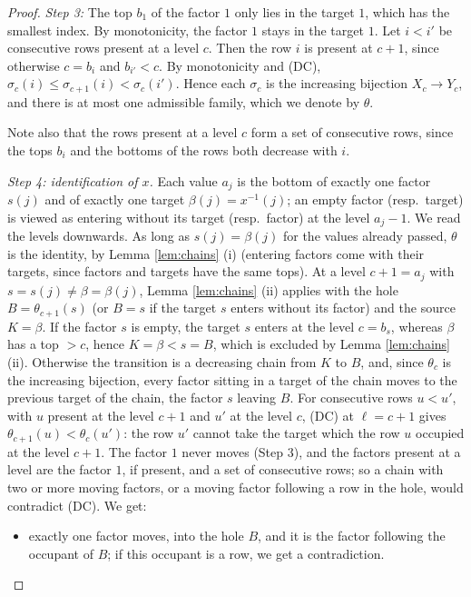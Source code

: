 \documentclass[a4paper,12pt,leqno]{amsart}
\theoremstyle{plain}
\theoremstyle{definition}
\theoremstyle{definition}
\begin{document}
\begin{proof}
\emph{Step 3:} The top $b_1$ of the factor $1$ only lies in the target
$1$, which has the smallest index. By monotonicity, the factor $1$ stays in the target $1$. Let
$i<i'$ be consecutive rows present at a level $c$. Then the row $i$ is present at $c+1$, since
otherwise $c=b_i$ and $b_{i'}<c$. By monotonicity and (DC),
$\sigma_c(i)\leq\sigma_{c+1}(i)<\sigma_c(i')$. Hence each $\sigma_c$ is the increasing bijection
$X_c\rightarrow Y_c$, and there is at most one admissible family, which we denote by $\theta$.

Note also that the rows present at a level $c$ form a set of consecutive rows, since the tops $b_i$
and the bottoms of the rows both decrease with $i$.

\emph{Step 4: identification of $x$.} Each value $a_j$ is the bottom of exactly one factor $s(j)$ and
of exactly one target $\beta(j)=x^{-1}(j)$; an empty factor (resp.\ target) is viewed as entering
without its target (resp.\ factor) at the level $a_j-1$. We read the levels downwards. As long as
$s(j)=\beta(j)$ for the values already passed, $\theta$ is the identity, by Lemma \ref{lem:chains} (i)
(entering factors come with their targets, since factors and targets have the same tops). At a level
$c+1=a_j$ with $s=s(j)\neq\beta=\beta(j)$, Lemma \ref{lem:chains} (ii) applies with the hole
$B=\theta_{c+1}(s)$ (or $B=s$ if the target $s$ enters without its factor) and the source $K=\beta$. If the
factor $s$ is empty, the target $s$ enters at the level $c=b_s$, whereas $\beta$ has a top $>c$, hence
$K=\beta<s=B$, which is excluded by Lemma \ref{lem:chains} (ii). Otherwise the transition is a decreasing chain from $K$ to $B$, and, since
$\theta_c$ is the increasing bijection, every factor sitting in a target of the chain moves to the
previous target of the chain, the factor $s$ leaving $B$. For consecutive rows $u<u'$, with $u$ present
at the level $c+1$ and $u'$ at the level $c$, (DC) at $\ell=c+1$ gives $\theta_{c+1}(u)<\theta_c(u')$: the
row $u'$ cannot take the target which the row $u$ occupied at the level $c+1$. The factor $1$ never moves
(Step 3), and the factors present at a level are the factor $1$, if present, and a set of consecutive
rows; so a chain with two or more moving factors, or a moving factor following a row in the hole, would
contradict (DC). We get:
\begin{itemize}
\item[$(*)$] exactly one factor moves, into the hole $B$, and it is the factor following the
occupant of $B$; if this occupant is a row, we get a contradiction.
\end{itemize}

\end{proof}
\end{document}
